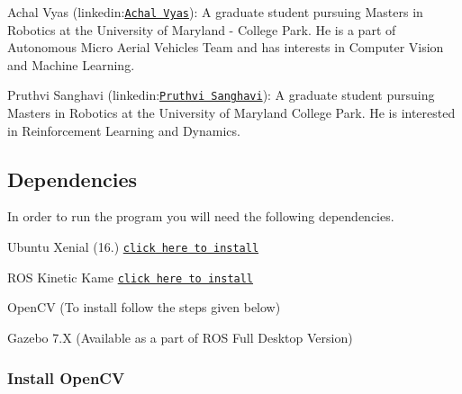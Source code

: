 \begin{DoxyItemize}
\item Achal Vyas (linkedin\+:\href{https://www.linkedin.com/in/achal-vyas-862a43146/}{\tt Achal Vyas})\+: A graduate student pursuing Masters in Robotics at the University of Maryland -\/ College Park. He is a part of Autonomous Micro Aerial Vehicles Team and has interests in Computer Vision and Machine Learning.
\item Pruthvi Sanghavi (linkedin\+:\href{https://www.linkedin.com/in/pruthvi-sanghavi/}{\tt Pruthvi Sanghavi})\+: A graduate student pursuing Masters in Robotics at the University of Maryland College Park. He is interested in Reinforcement Learning and Dynamics.
\end{DoxyItemize}

\subsection*{Dependencies}

In order to run the program you will need the following dependencies.
\begin{DoxyItemize}
\item Ubuntu Xenial (16.) \href{http://releases.ubuntu.com/16.04/}{\tt click here to install}
\item R\+OS Kinetic Kame \href{http://wiki.ros.org/kinetic/Installation/Ubuntu}{\tt click here to install}
\item Open\+CV (To install follow the steps given below)
\item Gazebo 7.\+X (Available as a part of R\+OS Full Desktop Version)
\end{DoxyItemize}

\subsubsection*{Install Open\+CV}


